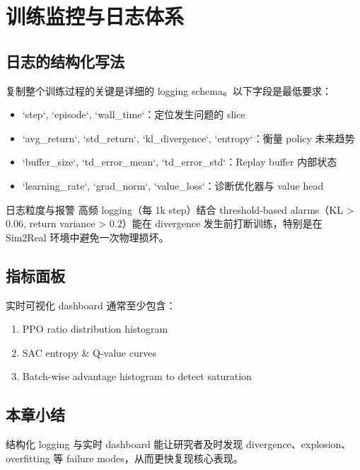 \section{训练监控与日志体系}

\subsection{日志的结构化写法}

复制整个训练过程的关键是详细的 logging schema。以下字段是最低要求：

\begin{itemize}
    \item `step`, `episode`, `wall_time`：定位发生问题的 slice
    \item `avg_return`, `std_return`, `kl_divergence`, `entropy`：衡量 policy 未来趋势
    \item `buffer_size`, `td_error_mean`, `td_error_std`：Replay buffer 内部状态
    \item `learning_rate`, `grad_norm`, `value_loss`：诊断优化器与 value head
\end{itemize}

\begin{importantbox}{日志粒度与报警}
高频 logging（每 1k step）结合 threshold-based alarms（KL > 0.06, return variance > 0.2）能在 divergence 发生前打断训练，特别是在 Sim2Real 环境中避免一次物理损坏。
\end{importantbox}

\subsection{指标面板}

实时可视化 dashboard 通常至少包含：

\begin{enumerate}
    \item PPO ratio distribution histogram
    \item SAC entropy & Q-value curves
    \item Batch-wise advantage histogram to detect saturation
\end{enumerate}

\subsection{本章小结}

结构化 logging 与实时 dashboard 能让研究者及时发现 divergence、explosion、overfitting 等 failure modes，从而更快复现核心表现。

